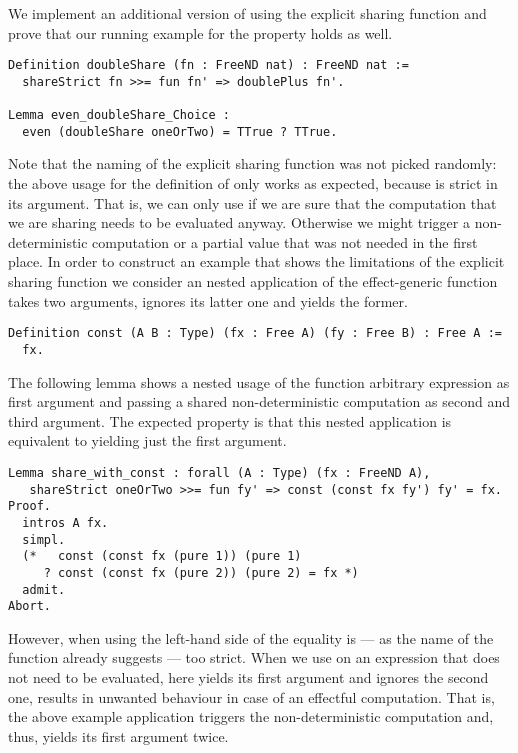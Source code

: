 We implement an additional version of  using the
explicit sharing function and prove that our running example for the
property holds as well.

\begin{verbatim}
Definition doubleShare (fn : FreeND nat) : FreeND nat :=
  shareStrict fn >>= fun fn' => doublePlus fn'.

Lemma even_doubleShare_Choice :
  even (doubleShare oneOrTwo) = TTrue ? TTrue.
\end{verbatim}

Note that the naming of the explicit sharing function was not picked
randomly: the above usage for the definition of  only
works as expected, because  is strict in its
argument.
That is, we can only use  if we are sure that the
computation that we are sharing needs to be evaluated anyway.
Otherwise we might trigger a non-deterministic computation or a
partial value that was not needed in the first place.
In order to construct an example that shows the limitations of the
explicit sharing function we consider an nested application of the
effect-generic function  takes two arguments, ignores its
latter one and yields the former.

\begin{verbatim}
Definition const (A B : Type) (fx : Free A) (fy : Free B) : Free A :=
  fx.
\end{verbatim}

The following lemma shows a nested usage of the function 
arbitrary expression as first argument and passing a shared
non-deterministic computation as second and third argument.
The expected property is that this nested application is equivalent to
yielding just the first argument.

\begin{verbatim}
Lemma share_with_const : forall (A : Type) (fx : FreeND A),
   shareStrict oneOrTwo >>= fun fy' => const (const fx fy') fy' = fx.
Proof.
  intros A fx.
  simpl.
  (*   const (const fx (pure 1)) (pure 1)
     ? const (const fx (pure 2)) (pure 2) = fx *)
  admit.
Abort.
\end{verbatim}

However, when using  the left-hand side of the
equality is --- as the name of the function already suggests --- too
strict.
When we use  on an expression that does not need to
be evaluated, here  yields its first argument and ignores
the second one, results in unwanted behaviour in case of an effectful
computation.
That is, the above example application triggers the non-deterministic
computation  and, thus, yields its first argument
 twice.

